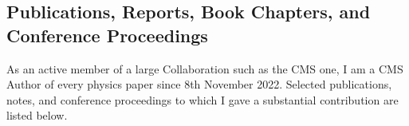 \documentclass[11pt]{res}
\newcommand{\MarginText}[1]{\section{#1}\vspace{10pt}}
\begin{document}
\begin{resume}

\MarginText{Publications, Reports, Book Chapters, and Conference Proceedings}\label{publications}

As an active member of a large Collaboration such as the CMS one, I am a CMS Author of every physics paper since 8th November 2022. Selected publications, notes, and conference proceedings to which I gave a substantial contribution are listed below.
\nocite{*}


\vspace{10pt}
\printbibliography[heading=none,sorting=ynt]










\end{resume}
\end{document}
